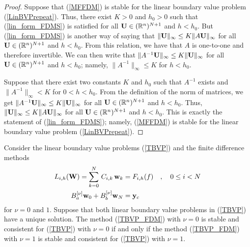 \begin{proof}
 Suppose that (\ref{MFFDM}) is stable for the linear boundary
value problem  (\ref{LinBVPrepeat}).   Thus, there exist $K>0$ and
$h_0 >0$ such that (\ref{lin_form_FDMS}) is 
satisfied for all $\mathbf{U} \in (\mathbb{R}^n)^{N+1}$ and $h < h_0$.  But
(\ref{lin_form_FDMS}) is another way of saying that
$\| \mathbf{U} \|_\infty \leq K \| A \mathbf{U}\|_\infty$ for all
$\mathbf{U} \in (\mathbb{R}^n)^{N+1}$ and $h < h_0$.   From this relation, we
have that $A$ is one-to-one and therefore invertible.  We can then
write that $\| A^{-1} \mathbf{U} \|_\infty \leq K \|\mathbf{U} \|_\infty$
for all $\mathbf{U} \in (\mathbb{R}^n)^{N+1}$ and $h < h_0$; namely,
$\| A^{-1} \|_\infty \leq K$ for $h < h_0$.

 Suppose that there exist two constants $K$ and $h_0$ such
that $A^{-1}$ exists and $\| A^{-1} \|_\infty < K$ for
$0<h < h_0$.  From the definition of the norm of matrices, we get
$\| A^{-1} \mathbf{U} \|_\infty \leq K \|\mathbf{U} \|_\infty$ for all
$\mathbf{U} \in (\mathbb{R}^n)^{N+1}$ and $h < h_0$.  Thus,
$\|\mathbf{U} \|_\infty \leq K \| A \mathbf{U} \|_\infty$ for all
$\mathbf{U} \in (\mathbb{R}^n)^{N+1}$ and $h < h_0$.  This is exactly the statement of
(\ref{lin_form_FDMS}); namely, (\ref{MFFDM}) is stable for the linear
boundary value problem  (\ref{LinBVPrepeat}).
\end{proof}

\begin{theorem}
Consider the linear boundary value problems (\ref{TBVP}) and the finite
difference methods
\begin{equation} \label{TBVP_FDM}
\begin{split}
L_{i,h}(\mathbf{W}) = \sum_{k=0}^N\,C_{i,k}\,\mathbf{w}_k
& = F_{i,h}(f) \quad , \quad 0 \leq i < N \\
B_a^{[\nu]}\mathbf{w}_0 + B_b^{[\nu]}\mathbf{w}_N &= \mathbf{y}_c
\end{split}
\end{equation}
for $\nu=0$ and $1$.  Suppose that both linear boundary value problems
in (\ref{TBVP}) have a unique solution.  The method (\ref{TBVP_FDM})
with $\nu=0$ is stable and consistent for (\ref{TBVP}) with $\nu=0$ if
and only if the method (\ref{TBVP_FDM}) with $\nu=1$ is stable and
consistent for (\ref{TBVP}) with $\nu=1$.
\label{Equ_0and1}
\end{theorem}

